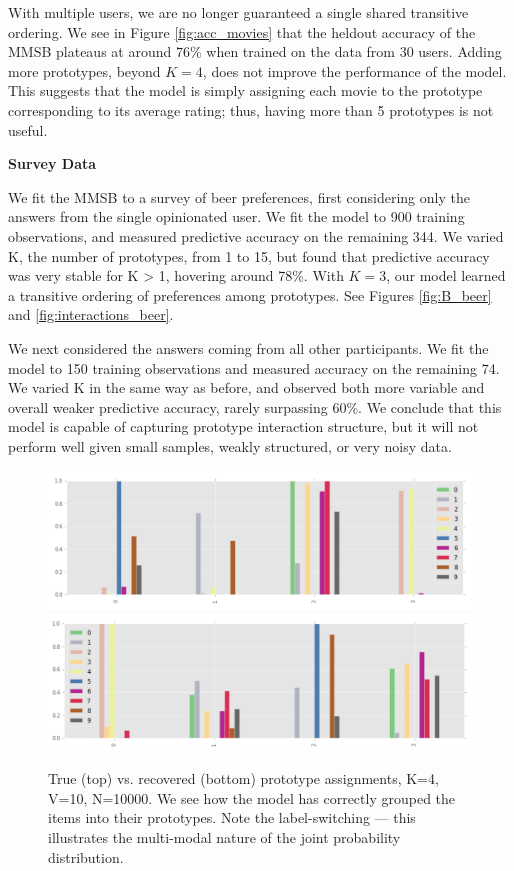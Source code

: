 With multiple users, we are no longer guaranteed a single shared transitive
ordering.
We see in Figure \ref{fig:acc_movies} that the heldout accuracy of the
MMSB plateaus at around $76\%$ when trained on the data from 30 users.
Adding more prototypes, beyond $K=4$, does not improve the
performance of the model. This suggests that the model is simply assigning each
movie to the prototype corresponding to its average rating; thus, having more
than 5 prototypes is not useful.

\textbf{Survey Data}

We fit the MMSB to a survey of beer preferences, first considering only the answers from the single opinionated user.
We fit the model to 900 training observations, and measured predictive accuracy on the remaining 344.
We varied K, the number of prototypes, from 1 to 15, but found that predictive accuracy was very stable for K > 1, hovering around 78\%.
With $K=3$, our model learned a transitive ordering of preferences among prototypes. See Figures \ref{fig:B_beer} and \ref{fig:interactions_beer}.

We next considered the answers coming from all other participants.
We fit the model to 150 training observations and measured accuracy on the remaining 74.
We varied K in the same way as before, and observed both more variable and overall weaker predictive accuracy, rarely surpassing 60\%.
We conclude that this model is capable of capturing prototype interaction structure, but it will not perform well given small samples, weakly structured, or very noisy data.

\begin{figure}
\includegraphics[width=\textwidth]{images/pi}
\includegraphics[width=\textwidth]{images/gamma}
\caption{True (top) vs. recovered (bottom) prototype assignments, K=4, V=10, N=10000. We see how the model has correctly grouped the items into their prototypes. Note the label-switching --- this illustrates the multi-modal nature of the joint probability distribution.}
\label{fig:pi_v_gamma} 
\end{figure}

